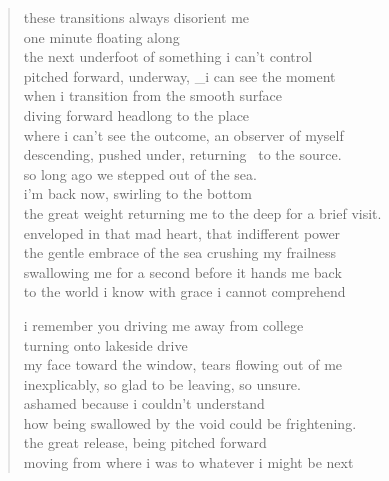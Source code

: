 \begin{verse}
these transitions always disorient me \\
one minute floating along \\
the next underfoot of something i can't control \\
pitched forward, underway, _i can see the moment \\
when i transition from the smooth surface \\
diving forward headlong to the place \\
where i can't see the outcome, an observer of myself \\
descending, pushed under, returning  to the source. \\
so long ago we stepped out of the sea. \\
i’m back now, swirling to the bottom \\
the great weight returning me to the deep for a brief visit. \\
enveloped in that mad heart, that indifferent power \\
the gentle embrace of the sea crushing my frailness \\
swallowing me for a second before it hands me back \\
to the world i know with grace i cannot comprehend

i remember you driving me away from college \\
turning onto lakeside drive \\
my face toward the window, tears flowing out of me \\
inexplicably, so glad to be leaving, so unsure. \\
ashamed because i couldn't understand \\
how being swallowed by the void could be frightening. \\
the great release, being pitched forward  \\
moving from where i was to whatever i might be next
\end{verse}
